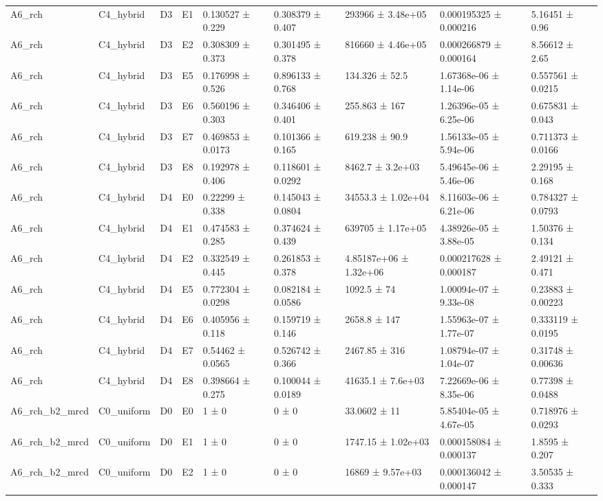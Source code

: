 \begin{table}
\begin{tabular}{lllllllll}
A6\_rch & C4\_hybrid & D3 & E1 & 0.130527 ± 0.229 & 0.308379 ± 0.407 & 293966 ± 3.48e+05 & 0.000195325 ± 0.000216 & 5.16451 ± 0.96 \\
A6\_rch & C4\_hybrid & D3 & E2 & 0.308309 ± 0.373 & 0.301495 ± 0.378 & 816660 ± 4.46e+05 & 0.000266879 ± 0.000164 & 8.56612 ± 2.65 \\
A6\_rch & C4\_hybrid & D3 & E5 & 0.176998 ± 0.526 & 0.896133 ± 0.768 & 134.326 ± 52.5 & 1.67368e-06 ± 1.14e-06 & 0.557561 ± 0.0215 \\
A6\_rch & C4\_hybrid & D3 & E6 & 0.560196 ± 0.303 & 0.346406 ± 0.401 & 255.863 ± 167 & 1.26396e-05 ± 6.25e-06 & 0.675831 ± 0.043 \\
A6\_rch & C4\_hybrid & D3 & E7 & 0.469853 ± 0.0173 & 0.101366 ± 0.165 & 619.238 ± 90.9 & 1.56133e-05 ± 5.94e-06 & 0.711373 ± 0.0166 \\
A6\_rch & C4\_hybrid & D3 & E8 & 0.192978 ± 0.406 & 0.118601 ± 0.0292 & 8462.7 ± 3.2e+03 & 5.49645e-06 ± 5.46e-06 & 2.29195 ± 0.168 \\
A6\_rch & C4\_hybrid & D4 & E0 & 0.22299 ± 0.338 & 0.145043 ± 0.0804 & 34553.3 ± 1.02e+04 & 8.11603e-06 ± 6.21e-06 & 0.784327 ± 0.0793 \\
A6\_rch & C4\_hybrid & D4 & E1 & 0.474583 ± 0.285 & 0.374624 ± 0.439 & 639705 ± 1.17e+05 & 4.38926e-05 ± 3.88e-05 & 1.50376 ± 0.134 \\
A6\_rch & C4\_hybrid & D4 & E2 & 0.332549 ± 0.445 & 0.261853 ± 0.378 & 4.85187e+06 ± 1.32e+06 & 0.000217628 ± 0.000187 & 2.49121 ± 0.471 \\
A6\_rch & C4\_hybrid & D4 & E5 & 0.772304 ± 0.0298 & 0.082184 ± 0.0586 & 1092.5 ± 74 & 1.00094e-07 ± 9.33e-08 & 0.23883 ± 0.00223 \\
A6\_rch & C4\_hybrid & D4 & E6 & 0.405956 ± 0.118 & 0.159719 ± 0.146 & 2658.8 ± 147 & 1.55963e-07 ± 1.77e-07 & 0.333119 ± 0.0195 \\
A6\_rch & C4\_hybrid & D4 & E7 & 0.54462 ± 0.0565 & 0.526742 ± 0.366 & 2467.85 ± 316 & 1.08794e-07 ± 1.04e-07 & 0.31748 ± 0.00636 \\
A6\_rch & C4\_hybrid & D4 & E8 & 0.398664 ± 0.275 & 0.100044 ± 0.0189 & 41635.1 ± 7.6e+03 & 7.22669e-06 ± 8.35e-06 & 0.77398 ± 0.0488 \\
A6\_rch\_b2\_mrcd & C0\_uniform & D0 & E0 & 1 ± 0 & 0 ± 0 & 33.0602 ± 11 & 5.85404e-05 ± 4.67e-05 & 0.718976 ± 0.0293 \\
A6\_rch\_b2\_mrcd & C0\_uniform & D0 & E1 & 1 ± 0 & 0 ± 0 & 1747.15 ± 1.02e+03 & 0.000158084 ± 0.000137 & 1.8595 ± 0.207 \\
A6\_rch\_b2\_mrcd & C0\_uniform & D0 & E2 & 1 ± 0 & 0 ± 0 & 16869 ± 9.57e+03 & 0.000136042 ± 0.000147 & 3.50535 ± 0.333 \\

\end{tabular}
\end{table}
